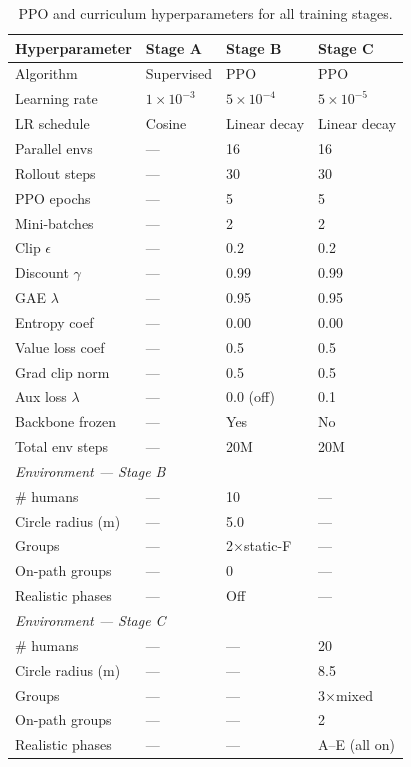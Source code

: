 \begin{table}[h]
\centering
\caption{PPO and curriculum hyperparameters for all training stages.}
\label{tab:hparams}
\small
\begin{tabular}{llll}
\toprule
\textbf{Hyperparameter} & \textbf{Stage A} & \textbf{Stage B} & \textbf{Stage C} \\
\midrule
Algorithm           & Supervised          & PPO              & PPO \\
Learning rate       & $1\!\times\!10^{-3}$ & $5\!\times\!10^{-4}$ & $5\!\times\!10^{-5}$ \\
LR schedule         & Cosine              & Linear decay     & Linear decay \\
Parallel envs       & —                   & 16               & 16 \\
Rollout steps       & —                   & 30               & 30 \\
PPO epochs          & —                   & 5                & 5 \\
Mini-batches        & —                   & 2                & 2 \\
Clip $\epsilon$     & —                   & 0.2              & 0.2 \\
Discount $\gamma$   & —                   & 0.99             & 0.99 \\
GAE $\lambda$       & —                   & 0.95             & 0.95 \\
Entropy coef        & —                   & 0.00             & 0.00 \\
Value loss coef     & —                   & 0.5              & 0.5 \\
Grad clip norm      & —                   & 0.5              & 0.5 \\
Aux loss $\lambda$  & —                   & 0.0 (off)        & 0.1 \\
Backbone frozen     & —                   & Yes              & No  \\
Total env steps     & —                   & 20M              & 20M \\
\midrule
\multicolumn{4}{l}{\textit{Environment — Stage B}} \\
\# humans           & — & 10  & — \\
Circle radius (m)   & — & 5.0 & — \\
Groups              & — & 2×static-F & — \\
On-path groups      & — & 0   & — \\
Realistic phases    & — & Off & — \\
\midrule
\multicolumn{4}{l}{\textit{Environment — Stage C}} \\
\# humans           & — & — & 20 \\
Circle radius (m)   & — & — & 8.5 \\
Groups              & — & — & 3×mixed \\
On-path groups      & — & — & 2 \\
Realistic phases    & — & — & A–E (all on) \\
\bottomrule
\end{tabular}
\end{table}

